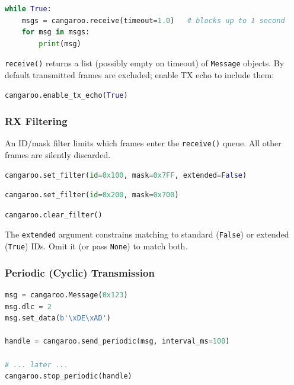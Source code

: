 \documentclass[a4paper,11pt]{article}
\begin{document}
\begin{lstlisting}[language=Python, caption={Blocking receive loop}]
while True:
    msgs = cangaroo.receive(timeout=1.0)   # blocks up to 1 second
    for msg in msgs:
        print(msg)
\end{lstlisting}

\texttt{receive()} returns a list (possibly empty on timeout) of \texttt{Message}
objects. By default transmitted frames are excluded; enable TX echo to include them:

\begin{lstlisting}[language=Python]
cangaroo.enable_tx_echo(True)
\end{lstlisting}

\subsubsection{RX Filtering}

An ID/mask filter limits which frames enter the \texttt{receive()} queue.
All other frames are silently discarded.

\begin{lstlisting}[language=Python, caption={Accept only ID 0x100 (standard frames)}]
cangaroo.set_filter(id=0x100, mask=0x7FF, extended=False)
\end{lstlisting}

\begin{lstlisting}[language=Python, caption={Accept a range of IDs (0x200-0x2FF)}]
cangaroo.set_filter(id=0x200, mask=0x700)
\end{lstlisting}

\begin{lstlisting}[language=Python, caption={Remove the filter (accept all frames)}]
cangaroo.clear_filter()
\end{lstlisting}

The \texttt{extended} argument constrains matching to standard (\texttt{False})
or extended (\texttt{True}) IDs. Omit it (or pass \texttt{None}) to match both.

\subsubsection{Periodic (Cyclic) Transmission}

\begin{lstlisting}[language=Python, caption={Send a heartbeat every 100 ms}]
msg = cangaroo.Message(0x123)
msg.dlc = 2
msg.set_data(b'\xDE\xAD')

handle = cangaroo.send_periodic(msg, interval_ms=100)

# ... later ...
cangaroo.stop_periodic(handle)
\end{lstlisting}
\end{document}
